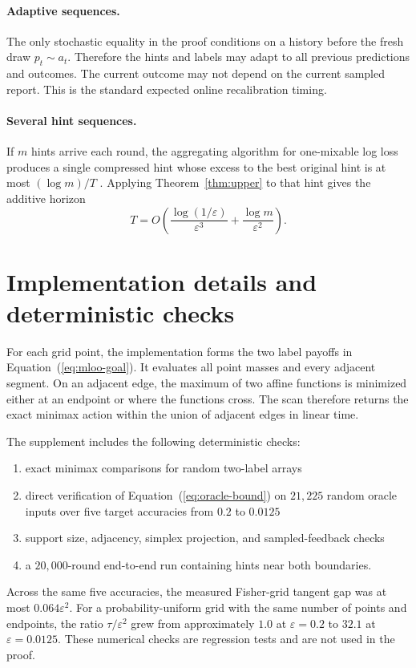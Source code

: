 \documentclass{article}
\begin{document}
\paragraph{Adaptive sequences.}
The only stochastic equality in the proof conditions on a history before the fresh draw $p_t\sim a_t$. Therefore the hints and labels may adapt to all previous predictions and outcomes. The current outcome may not depend on the current sampled report. This is the standard expected online recalibration timing.

\paragraph{Several hint sequences.}
If $m$ hints arrive each round, the aggregating algorithm for one-mixable log loss produces a single compressed hint whose excess to the best original hint is at most $(\log m)/T$ \citep{cesabianchi2006prediction}. Applying Theorem~\ref{thm:upper} to that hint gives the additive horizon
\begin{equation}
 T=O\left(
 \frac{\log(1/\varepsilon)}{\varepsilon^3}
 +\frac{\log m}{\varepsilon^2}
 \right).
 \label{eq:multi-hint}
\end{equation}

\section{Implementation details and deterministic checks}
\label{app:implementation}

For each grid point, the implementation forms the two label payoffs in Equation~(\ref{eq:mloo-goal}). It evaluates all point masses and every adjacent segment. On an adjacent edge, the maximum of two affine functions is minimized either at an endpoint or where the functions cross. The scan therefore returns the exact minimax action within the union of adjacent edges in linear time.

The supplement includes the following deterministic checks:
\begin{enumerate}
 \item exact minimax comparisons for random two-label arrays
 \item direct verification of Equation~(\ref{eq:oracle-bound}) on
$21{,}225$ random oracle inputs over five target accuracies from $0.2$ to $0.0125$
 \item support size, adjacency, simplex projection, and sampled-feedback
checks
 \item a $20{,}000$-round end-to-end run containing hints near both
boundaries.
\end{enumerate}
Across the same five accuracies, the measured Fisher-grid tangent gap was at most $0.064\varepsilon^2$. For a probability-uniform grid with the same number of points and endpoints, the ratio $\tau/\varepsilon^2$ grew from approximately $1.0$ at $\varepsilon=0.2$ to $32.1$ at $\varepsilon=0.0125$. These numerical checks are regression tests and are not used in the proof.
\end{document}
